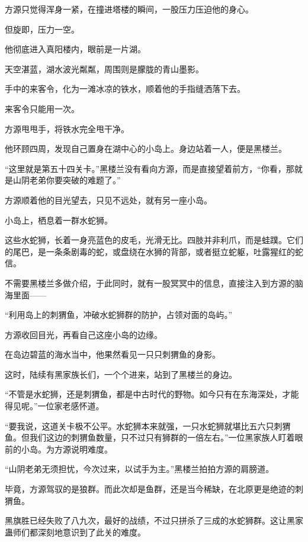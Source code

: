 
\begin{this_body}



方源只觉得浑身一紧，在撞进塔楼的瞬间，一股压力压迫他的身心。

但旋即，压力一空。

他彻底进入真阳楼内，眼前是一片湖。

天空湛蓝，湖水波光粼粼，周围则是朦胧的青山墨影。

手中的来客令，化为一滩冰凉的铁水，顺着他的手指缝洒落下去。

来客令只能用一次。

方源甩甩手，将铁水完全甩干净。

他环顾四周，发现自己置身在湖中心的小岛上。身边站着一人，便是黑楼兰。

“这里就是第五十四关卡。”黑楼兰没有看向方源，而是直接望着前方，“你看，那就是山阴老弟你要突破的难题了。”

方源顺着他的目光望去，只见不远处，就有另一座小岛。

小岛上，栖息着一群水蛇狮。

这些水蛇狮，长着一身亮蓝色的皮毛，光滑无比。四肢并非利爪，而是蛙蹼。它们的尾巴，是一条条剧毒的蛇，或盘绕在水狮的背部，或者挺立蛇躯，吐露猩红的蛇信。

不需要黑楼兰多做介绍，于此同时，就有一股冥冥中的信息，直接注入到方源的脑海里面——

“利用岛上的刺猬鱼，冲破水蛇狮群的防护，占领对面的岛屿。”

方源收回目光，再看自己这座小岛的边缘。

在岛边碧蓝的海水当中，他果然看见一只只刺猬鱼的身影。

这时，陆续有黑家族长们，一个个进来，站到了黑楼兰的身边。

“不管是水蛇狮，还是刺猬鱼，都是中古时代的野物。如今只有在东海深处，才能得见呢。”一位家老感怀道。

“要我说，这道关卡极不公平。水蛇狮本来就强，一只水蛇狮就堪比五六只刺猬鱼。但我们这边的刺猬鱼数量，只不过只有狮群的一倍左右。”一位黑家族人盯着眼前的小岛。为方源说明难度。

“山阴老弟无须担忧，今次过来，以试手为主。”黑楼兰拍拍方源的肩膀道。

毕竟，方源驾驭的是狼群。而此次却是鱼群，还是当今稀缺，在北原更是绝迹的刺猬鱼。

黑旗胜已经失败了八九次，最好的战绩，不过只拼杀了三成的水蛇狮群。这让黑家蛊师们都深刻地意识到了此关的难度。


\end{this_body}
